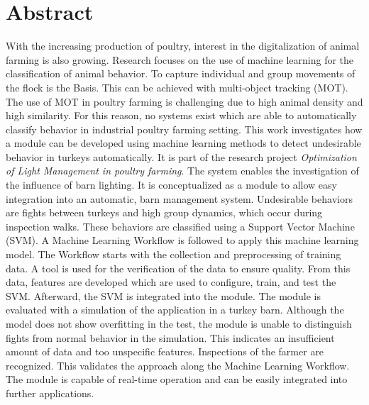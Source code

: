 \section*{Abstract}
\vspace*{-5mm}
With the increasing production of poultry, interest in the digitalization of animal farming is also growing. Research focuses on the use of machine learning for the classification of animal behavior. To capture individual and group movements of the flock is the Basis. This can be achieved with multi-object tracking (MOT). The use of MOT in poultry farming is challenging due to high animal density and high similarity. For this reason, no systems exist which are able to automatically classify behavior in industrial poultry farming setting. This work investigates how a module can be developed using machine learning methods to detect undesirable behavior in turkeys automatically. It is part of the research project \textit{Optimization of Light Management in poultry farming}. The system enables the investigation of the influence of barn lighting. It is conceptualized as a module to allow easy integration into an automatic, barn management system. Undesirable behaviors are fights between turkeys and high group dynamics, which occur during inspection walks. These behaviors are classified using a Support Vector Machine (SVM). A Machine Learning Workflow is followed to apply this machine learning model. The Workflow starts with the collection and preprocessing of training data. A tool is used for the verification of the data to ensure quality. From this data, features are developed which are used to  configure, train, and test the SVM. Afterward, the SVM is integrated into the module. The module is evaluated with a simulation of the application in a turkey barn. Although the model does not show overfitting in the test, the module is unable to distinguish fights from normal behavior in the simulation. This indicates an insufficient amount of data and too unspecific features. Inspections of the farmer are recognized. This validates the approach along the Machine Learning Workflow. The module is capable of real-time operation and can be easily integrated into further applications.


